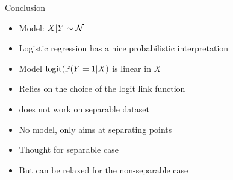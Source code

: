 \documentclass[xcolor={usenames,dvipsnames}]{beamer}
\begin{document}
\begin{frame}{Conclusion}
  
\begin{itemize}
\item Model: $X|Y \sim \Nc$
\end{itemize}
  \begin{itemize}
  \item Logistic regression has a nice probabilistic interpretation
  \item Model $\mathrm{logit}(\P(Y=1|X)$ is linear in $X$
  \item Relies on the choice of the logit link function
  \item[{\color{Red}\ding{55}}] does not work on separable dataset
  \end{itemize}
  
  \bigskip
  \begin{itemize}
  \item No model, only aims at separating points
  \item[\color{Emerald}\ding{51}] Thought for separable case
  \item[\color{Emerald}\ding{51}] But can be relaxed for the non-separable case
  \end{itemize}
  \end{frame}


\end{document}

